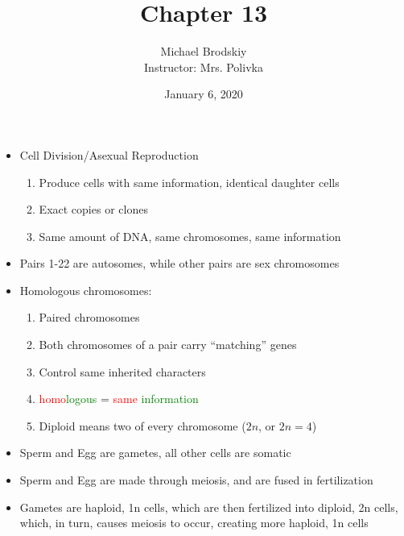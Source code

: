 \documentclass[12pt]{article}
\title{Chapter 13}
\date{January 6, 2020}
\author{Michael Brodskiy\\ \small Instructor: Mrs. Polivka}
\begin{document}
\maketitle

\begin{itemize}

  \item Cell Division/Asexual Reproduction

    \begin{enumerate}

      \item Produce cells with same information, identical daughter cells

      \item Exact copies or clones

      \item Same amount of DNA, same chromosomes, same information

    \end{enumerate}

  \item Pairs 1-22 are autosomes, while other pairs are sex chromosomes

  \item Homologous chromosomes:

    \begin{enumerate}

      \item Paired chromosomes

      \item Both chromosomes of a pair carry ``matching'' genes

      \item Control same inherited characters

      \item \textcolor{red}{homo}\textcolor{green}{logous} = \textcolor{red}{same} \textcolor{green}{information} 

      \item Diploid means two of every chromosome ($2n$, or $2n=4$)

    \end{enumerate}

  \item Sperm and Egg are gametes, all other cells are somatic

  \item Sperm and Egg are made through meiosis, and are fused in fertilization

  \item Gametes are haploid, 1n cells, which are then fertilized into diploid, 2n cells, which, in turn, causes meiosis to occur, creating more haploid, 1n cells


\end{itemize}
\end{document}

